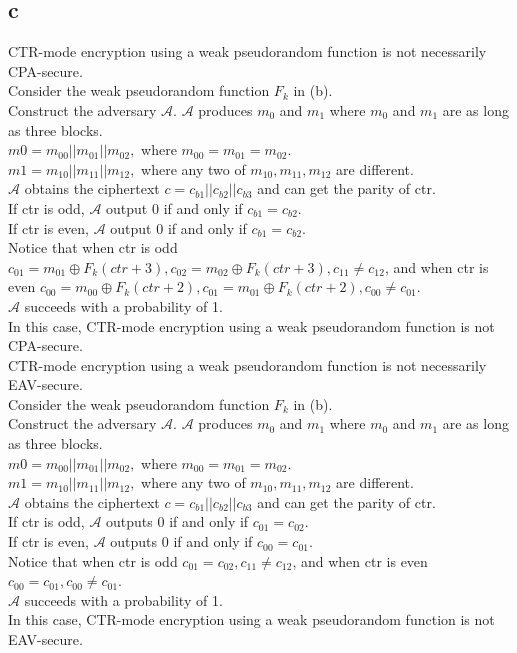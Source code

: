 \documentclass[a4papers]{ctexart}
\begin{document}
\subsection*{c}
\noindent CTR-mode encryption using a weak pseudorandom function is not necessarily CPA-secure.\\
Consider the weak pseudorandom function $F_k$ in (b).\\
Construct the adversary $\mathcal{A}$.
$\mathcal{A}$ produces $m_0$ and $m_1$ where $m_0$ and $m_1$ are as long as three blocks. \\
$m0 = m_{00}||m_{01}||m_{02},$ where $m_{00} = m_{01} = m_{02}$.\\
$m1 = m_{10}||m_{11}||m_{12},$ where any two of $m_{10}, m_{11}, m_{12}$ are different.\\
$\mathcal{A}$ obtains the ciphertext $c=c_{b1} || c_{b2} || c_{b3}$ and can get the parity of ctr.\\
If ctr is odd, $\mathcal{A}$ output 0 if and only if $c_{b1}= c_{b2}$.\\
If ctr is even, $\mathcal{A}$ output 0 if and only if $c_{b1}= c_{b2}$.\\
Notice that when ctr is odd $c_{01} = m_{01} \oplus F_k(ctr+3), c_{02} = m_{02} \oplus F_k(ctr+3),c_{11}\ne c_{12}$,
and when ctr is even $c_{00} = m_{00}\oplus F_k(ctr+2), c_{01} = m_{01} \oplus F_k(ctr+2),c_{00}\ne c_{01}$.\\
$\mathcal{A}$ succeeds with a probability of 1.\\
In this case, CTR-mode encryption using a weak pseudorandom function is not CPA-secure.\\


\noindent CTR-mode encryption using a weak pseudorandom function is not necessarily EAV-secure.\\
Consider the weak pseudorandom function $F_k$ in (b).\\
Construct the adversary $\mathcal{A}$.
$\mathcal{A}$ produces $m_0$ and $m_1$ where $m_0$ and $m_1$ are as long as three blocks. \\
$m0 = m_{00}||m_{01}||m_{02},$ where $m_{00} = m_{01} = m_{02}$.\\
$m1 = m_{10}||m_{11}||m_{12},$ where any two of $m_{10}, m_{11}, m_{12}$ are different.\\
$\mathcal{A}$ obtains the ciphertext $c=c_{b1} || c_{b2} || c_{b3}$ and can get the parity of ctr.\\
If ctr is odd, $\mathcal{A}$ outputs 0 if and only if $c_{01}=c_{02}$.\\
If ctr is even, $\mathcal{A}$ outputs 0 if and only if $c_{00}=c_{01}$.\\
Notice that when ctr is odd $c_{01} = c_{02} ,c_{11}\ne c_{12}$,
and when ctr is even $c_{00} = c_{01} ,c_{00}\ne c_{01}$.\\
$\mathcal{A}$ succeeds with a probability of 1.\\
In this case, CTR-mode encryption using a weak pseudorandom function is not EAV-secure.\\
\end{document}
